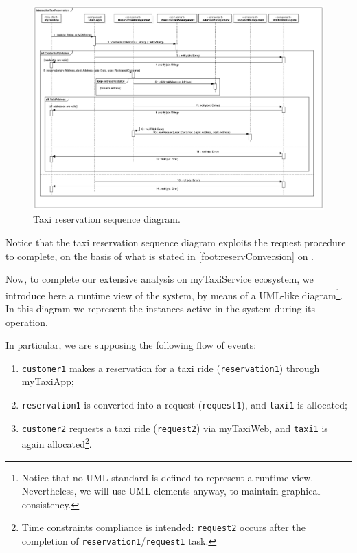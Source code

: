 \clearpage

\begin{figure}%
	\centering%
	\includegraphics[width=\textwidth]{img/Sequence__Collaboration2__Interaction1__TaxiReservation_3}%
	\caption{Taxi reservation sequence diagram.}\label{fig:resSequence}%
\end{figure}

Notice that the taxi reservation sequence diagram exploits the request procedure to complete, on the basis of what is stated in \cref{foot:reservConversion} on .

Now, to complete our extensive analysis on myTaxiService ecosystem, we introduce here a runtime view of the system, by means of a \mbox{UML-like} diagram\footnote{Notice that no UML standard is defined to represent a runtime view. Nevertheless, we will use UML elements anyway, to maintain graphical consistency.}. In this diagram we represent the instances active in the system during its operation.

In particular, we are supposing the following flow of events: \begin{enumerate}
	
	\item \texttt{cus\-tom\-er1} makes a reservation for a taxi ride (\texttt{reservation1}) through myTaxiApp;
	
	\item \texttt{res\-er\-va\-tion1} is converted into a request (\texttt{re\-quest1}), and \texttt{taxi1} is allocated;
	
	\item \texttt{cus\-tom\-er2} requests a taxi ride (\texttt{re\-quest2}) via myTaxiWeb, and \texttt{taxi1} is again allocated\protect\footnote{Time constraints compliance is intended: \texttt{re\-quest2} occurs after the completion of \texttt{res\-er\-va\-tion1}/\texttt{re\-quest1} task.}.
	
\end{enumerate}

